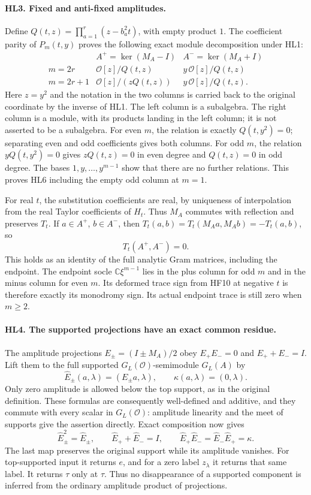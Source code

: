 \documentclass[11pt,a4paper]{article}
\theoremstyle{definition}\newtheorem{definition}[theorem]{Definition}
\begin{document}
\paragraph{HL3. Fixed and anti-fixed amplitudes.}
Define $Q(t,z)=\prod_{a=1}^r(z-b_a^2t)$, with empty product $1$.
The coefficient parity of $P_m(t,y)$ proves the following exact
module decomposition under HL1:
\[
 \begin{array}{c|c|c}
 & A^+=\ker(M_A-I)&A^-=\ker(M_A+I)\\ \hline
 m=2r&\mathcal O[z]/Q(t,z)&y\,\mathcal O[z]/Q(t,z)\\
 m=2r+1&\mathcal O[z]/(zQ(t,z))&y\,\mathcal O[z]/Q(t,z).
 \end{array}
 \tag{HL6}
\]
Here $z=y^2$ and the notation in the two columns is carried back
to the original coordinate by the inverse of HL1. The left column
is a subalgebra. The right column is a module, with its products
landing in the left column; it is not asserted to be a subalgebra.
For even $m$, the relation is exactly $Q(t,y^2)=0$; separating
even and odd coefficients gives both columns. For odd $m$, the
relation $yQ(t,y^2)=0$ gives $zQ(t,z)=0$ in even degree and
$Q(t,z)=0$ in odd degree. The bases $1,y,\ldots,y^{m-1}$ show
that there are no further relations. This proves HL6 including
the empty odd column at $m=1$.

For real $t$, the substitution coefficients are real, by uniqueness
of interpolation from the real Taylor coefficients of $H_t$.
Thus $M_A$ commutes with reflection and preserves $T_t$.
If $a\in A^+$, $b\in A^-$, then
$T_t(a,b)=T_t(M_Aa,M_Ab)=-T_t(a,b)$, so
\[
 T_t(A^+,A^-)=0.
 \tag{HL7}
\]
This holds as an identity of the full analytic Gram matrices,
including the endpoint. The endpoint socle $\mathbb C\xi^{m-1}$
lies in the plus column for odd $m$ and in the minus column for
even $m$. Its deformed trace sign from HF10 at negative $t$ is
therefore exactly its monodromy sign. Its actual endpoint trace
is still zero when $m\ge2$.

\paragraph{HL4. The supported projections have an exact common residue.}
The amplitude projections $E_\pm=(I\pm M_A)/2$ obey
$E_+E_-=0$ and $E_++E_-=I$. Lift them to the full supported
$G_L(\mathcal O)$-semimodule $G_L(A)$ by
\[
 \widehat E_\pm(a,\lambda)=(E_\pm a,\lambda),
       \qquad \kappa(a,\lambda)=(0,\lambda).
 \tag{HL8}
\]
Only zero amplitude is allowed below the top support, as in the
original definition. These formulas are consequently well-defined
and additive, and they commute with every scalar in
$G_L(\mathcal O)$: amplitude linearity and the meet of supports
give the assertion directly. Exact composition now gives
\[
 \widehat E_\pm^2=\widehat E_\pm,\qquad
 \widehat E_++\widehat E_-=I,\qquad
 \boxed{\widehat E_+\widehat E_-
            =\widehat E_-\widehat E_+=\kappa.}
 \tag{HL9}
\]
The last map preserves the original support while its amplitude
vanishes. For top-supported input it returns $e$, and for a zero
label $z_\lambda$ it returns that same label. It returns $\tau$
only at $\tau$. Thus no disappearance of a supported component
is inferred from the ordinary amplitude product of projections.
\end{document}

